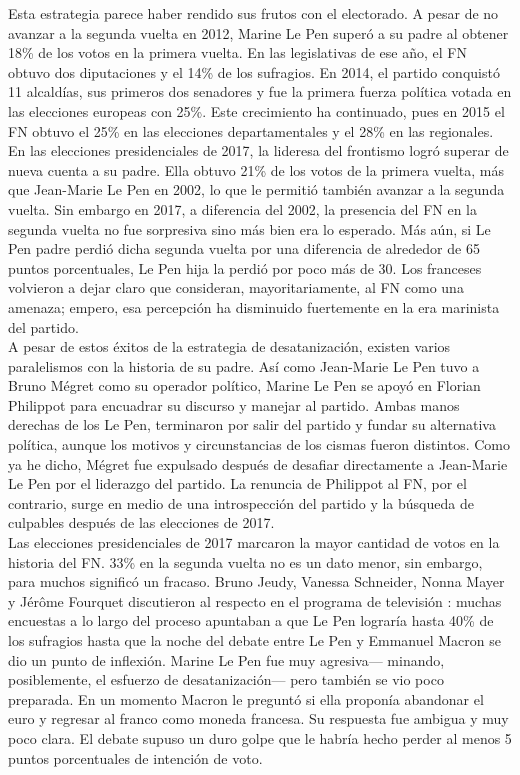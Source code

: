 Esta estrategia parece haber rendido sus frutos con el electorado. A pesar de no avanzar a la segunda vuelta en 2012, Marine Le Pen superó a su padre al obtener 18\% de los votos en la primera vuelta. En las legislativas de ese año, el FN obtuvo dos diputaciones y el 14\% de los sufragios. En 2014, el partido conquistó 11 alcaldías, sus primeros dos senadores y fue la primera fuerza política votada en las elecciones europeas con 25\%. Este crecimiento ha continuado, pues en 2015 el FN obtuvo el 25\% en las elecciones departamentales y el 28\% en las regionales.\\ 

En las elecciones presidenciales de 2017, la lideresa del frontismo logró superar de nueva cuenta a su padre. Ella obtuvo 21\% de los votos de la primera vuelta, más que Jean-Marie Le Pen en 2002, lo que le permitió también avanzar a la segunda vuelta. Sin embargo en 2017, a diferencia del 2002, la presencia del FN en la segunda vuelta no fue sorpresiva sino más bien era lo esperado. Más aún, si Le Pen padre perdió dicha segunda vuelta por una diferencia de alrededor de 65 puntos porcentuales, Le Pen hija la perdió por poco más de 30. Los franceses volvieron a dejar claro que consideran, mayoritariamente, al FN como una amenaza; empero, esa percepción ha disminuido fuertemente en la era marinista del partido.\\

A pesar de estos éxitos de la estrategia de desatanización, existen varios paralelismos con la historia de su padre. Así como Jean-Marie Le Pen tuvo a Bruno Mégret como su operador político, Marine Le Pen se apoyó en Florian Philippot para encuadrar su discurso y manejar al partido. Ambas manos derechas de los Le Pen, terminaron por salir del partido y fundar su alternativa política, aunque los motivos y circunstancias de los cismas fueron distintos. Como ya he dicho, Mégret fue expulsado después de desafiar directamente a Jean-Marie Le Pen por el liderazgo del partido. La renuncia de Philippot al FN, por el contrario, surge en medio de una introspección del partido y la búsqueda de culpables después de las elecciones de 2017.\\ 

Las elecciones presidenciales de 2017 marcaron la mayor cantidad de votos en la historia del FN. 33\% en la segunda vuelta no es un dato menor, sin embargo, para muchos significó un fracaso. Bruno Jeudy, Vanessa Schneider, Nonna Mayer y Jérôme Fourquet discutieron al respecto en el programa de televisión \textit{\textcite{CDansLAir17}}: muchas encuestas a lo largo del proceso apuntaban a que Le Pen lograría hasta 40\% de los sufragios hasta que la noche del debate entre Le Pen y Emmanuel Macron se dio un punto de inflexión. Marine Le Pen fue muy agresiva--- minando, posiblemente, el esfuerzo de desatanización--- pero también se vio poco preparada. En un momento Macron le preguntó si ella proponía abandonar el euro y regresar al franco como moneda francesa. Su respuesta fue ambigua y muy poco clara. El debate supuso un duro golpe que le habría hecho perder al menos 5 puntos porcentuales de intención de voto.\\

